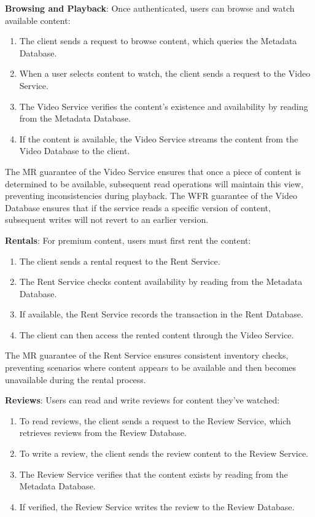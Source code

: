\textbf{Browsing and Playback}: Once authenticated, users can browse
and watch available content:

\begin{enumerate}
\item The client sends a request to browse content, which queries
  the Metadata Database.
\item When a user selects content to watch, the client sends a
  request to the Video Service.
\item The Video Service verifies the content's existence and
  availability by reading from the Metadata Database.
\item If the content is available, the Video Service streams the
  content from the Video Database to the client.
\end{enumerate}

The MR guarantee of the Video Service ensures that once a piece of
content is determined to be available, subsequent read operations
will maintain this view, preventing inconsistencies during playback.
The WFR guarantee of the Video Database ensures that if the service
reads a specific version of content, subsequent writes will not
revert to an earlier version.

\textbf{Rentals}: For premium content, users must first rent the content:

\begin{enumerate}
\item The client sends a rental request to the Rent Service.
\item The Rent Service checks content availability by reading from
  the Metadata Database.
\item If available, the Rent Service records the transaction in the
  Rent Database.
\item The client can then access the rented content through the Video Service.
\end{enumerate}

The MR guarantee of the Rent Service ensures consistent inventory
checks, preventing scenarios where content appears to be available
and then becomes unavailable during the rental process.

\textbf{Reviews}: Users can read and write reviews for content they've watched:

\begin{enumerate}
\item To read reviews, the client sends a request to the Review
  Service, which retrieves reviews from the Review Database.
\item To write a review, the client sends the review content to the
  Review Service.
\item The Review Service verifies that the content exists by
  reading from the Metadata Database.
\item If verified, the Review Service writes the review to the
  Review Database.
\end{enumerate}

